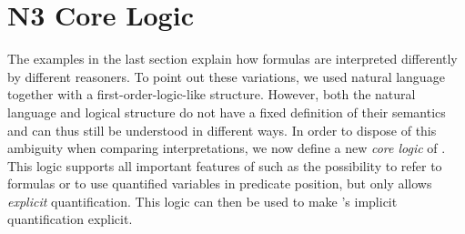 \section{N3 Core Logic}\label{core}
The examples in the last section explain how \nthree formulas are interpreted differently by different reasoners. To point out these variations,
we used natural language together with a
first-order-logic-like structure. However, both the natural language and logical structure do not have a fixed definition of their semantics and can 
thus still be understood in different 
ways. In order to dispose of this ambiguity when comparing interpretations, 
 we  now define a new \emph{core logic} of \nthree. 
This logic  supports all important features of \nthree such as the possibility to refer to formulas or to use quantified variables in predicate position, 
but only allows \emph{explicit} quantification. This logic can then be used to make \nthree's implicit quantification explicit.


